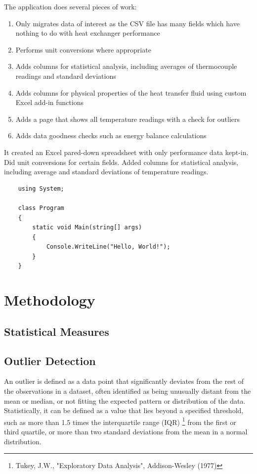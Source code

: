 \documentclass[12pt]{article}
\begin{document}
The application does several pieces of work:

\begin{enumerate}
	\item Only migrates data of interest as the CSV file has many fields which have nothing to do with heat exchanger performance
	\item Performs unit conversions where appropriate
	\item Adds columns for statistical analysis, including averages of thermocouple readings and standard deviations
	\item Adds columns for physical properties of the heat transfer fluid using custom Excel add-in functions
	\item Adds a page that shows all temperature readings with a check for outliers
	\item Adds data goodness checks such as energy balance calculations
	
\end{enumerate}

It created an Excel pared-down spreadsheet with only performance data kept-in.
Did unit conversions for certain fields.
Added columns for statistical analysis, including average and standard deviations of temperature readings.



\begin{lstlisting}
	using System;
	
	class Program
	{
		static void Main(string[] args)
		{
			Console.WriteLine("Hello, World!");
		}
	}
\end{lstlisting}


\section{Methodology}
\subsection{Statistical Measures}
\subsection{Outlier Detection}
An outlier is defined as a data point that significantly deviates from the rest of the observations in a dataset, often identified as being unusually distant from the mean or median, or not fitting the expected pattern or distribution of the data. Statistically, it can be defined as a value that lies beyond a specified threshold, such as more than 1.5 times the interquartile range (IQR) \footnote{Tukey, J.W., "Exploratory Data Analysis", Addison-Wesley (1977)} from the first or third quartile, or more than two standard deviations from the mean in a normal distribution.
\end{document}
